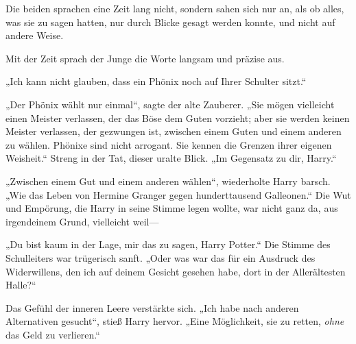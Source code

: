 Die beiden sprachen eine Zeit lang nicht, sondern sahen sich nur an, als ob alles, was sie zu sagen hatten, nur durch Blicke gesagt werden konnte, und nicht auf andere Weise.

Mit der Zeit sprach der Junge die Worte langsam und präzise aus.

„Ich kann nicht glauben, dass ein Phönix noch auf Ihrer Schulter sitzt.“

„Der Phönix wählt nur einmal“, sagte der alte Zauberer. „Sie mögen vielleicht einen Meister verlassen, der das Böse dem Guten vorzieht; aber sie werden keinen Meister verlassen, der gezwungen ist, zwischen einem Guten und einem anderen zu wählen. Phönixe sind nicht arrogant. Sie kennen die Grenzen ihrer eigenen Weisheit.“
Streng in der Tat, dieser uralte Blick. „Im Gegensatz zu dir, Harry.“

„Zwischen einem Gut und einem anderen wählen“, wiederholte Harry barsch. „Wie das Leben von Hermine Granger gegen hunderttausend Galleonen.“
Die Wut und Empörung, die Harry in seine Stimme legen wollte, war nicht ganz da, aus irgendeinem Grund, vielleicht weil—

„Du bist kaum in der Lage, mir das zu sagen, Harry Potter.“
Die Stimme des Schulleiters war trügerisch sanft.
„Oder was war das für ein Ausdruck des Widerwillens, den ich auf deinem Gesicht gesehen habe, dort in der Allerältesten Halle?“

Das Gefühl der inneren Leere verstärkte sich.
„Ich habe nach anderen Alternativen gesucht“, stieß Harry hervor. „Eine Möglichkeit, sie zu retten, \emph{ohne} das Geld zu verlieren.“

